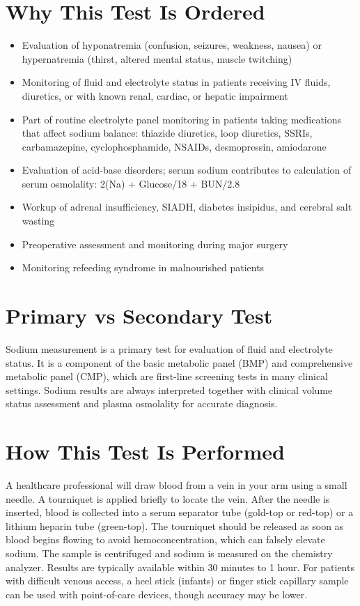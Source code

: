 \section*{Why This Test Is Ordered}
\begin{itemize}
  \item Evaluation of hyponatremia (confusion, seizures, weakness, nausea) or hypernatremia (thirst, altered mental status, muscle twitching)
  \item Monitoring of fluid and electrolyte status in patients receiving IV fluids, diuretics, or with known renal, cardiac, or hepatic impairment
  \item Part of routine electrolyte panel monitoring in patients taking medications that affect sodium balance: thiazide diuretics, loop diuretics, SSRIs, carbamazepine, cyclophosphamide, NSAIDs, desmopressin, amiodarone
  \item Evaluation of acid-base disorders; serum sodium contributes to calculation of serum osmolality: 2(Na) + Glucose/18 + BUN/2.8
  \item Workup of adrenal insufficiency, SIADH, diabetes insipidus, and cerebral salt wasting
  \item Preoperative assessment and monitoring during major surgery
  \item Monitoring refeeding syndrome in malnourished patients
\end{itemize}

\section*{Primary vs Secondary Test}
Sodium measurement is a primary test for evaluation of fluid and electrolyte status. It is a component of the basic metabolic panel (BMP) and comprehensive metabolic panel (CMP), which are first-line screening tests in many clinical settings. Sodium results are always interpreted together with clinical volume status assessment and plasma osmolality for accurate diagnosis.

\section*{How This Test Is Performed}
A healthcare professional will draw blood from a vein in your arm using a small needle. A tourniquet is applied briefly to locate the vein. After the needle is inserted, blood is collected into a serum separator tube (gold-top or red-top) or a lithium heparin tube (green-top). The tourniquet should be released as soon as blood begins flowing to avoid hemoconcentration, which can falsely elevate sodium. The sample is centrifuged and sodium is measured on the chemistry analyzer. Results are typically available within 30 minutes to 1 hour. For patients with difficult venous access, a heel stick (infants) or finger stick capillary sample can be used with point-of-care devices, though accuracy may be lower.


